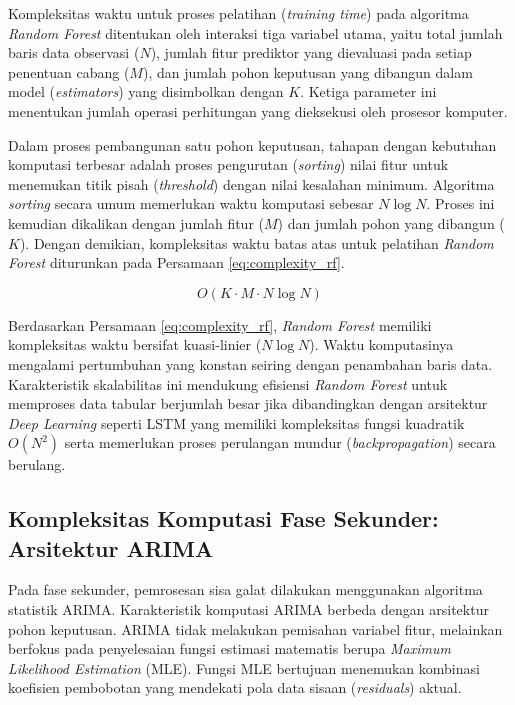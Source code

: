 Kompleksitas waktu untuk proses pelatihan (\textit{training time}) pada algoritma \textit{Random Forest} ditentukan oleh interaksi tiga variabel utama, yaitu total jumlah baris data observasi ($N$), jumlah fitur prediktor yang dievaluasi pada setiap penentuan cabang ($M$), dan jumlah pohon keputusan yang dibangun dalam model (\textit{estimators}) yang disimbolkan dengan $K$. Ketiga parameter ini menentukan jumlah operasi perhitungan yang dieksekusi oleh prosesor komputer.

Dalam proses pembangunan satu pohon keputusan, tahapan dengan kebutuhan komputasi terbesar adalah proses pengurutan (\textit{sorting}) nilai fitur untuk menemukan titik pisah (\textit{threshold}) dengan nilai kesalahan minimum. Algoritma \textit{sorting} secara umum memerlukan waktu komputasi sebesar $N \log N$. Proses ini kemudian dikalikan dengan jumlah fitur ($M$) dan jumlah pohon yang dibangun ($K$). Dengan demikian, kompleksitas waktu batas atas untuk pelatihan \textit{Random Forest} diturunkan pada Persamaan \ref{eq:complexity_rf}.

\begin{equation}
    O(K \cdot M \cdot N \log N)
\label{eq:complexity_rf}
\end{equation}

Berdasarkan Persamaan \ref{eq:complexity_rf}, \textit{Random Forest} memiliki kompleksitas waktu bersifat kuasi-linier ($N \log N$). Waktu komputasinya mengalami pertumbuhan yang konstan seiring dengan penambahan baris data. Karakteristik skalabilitas ini mendukung efisiensi \textit{Random Forest} untuk memproses data tabular berjumlah besar jika dibandingkan dengan arsitektur \textit{Deep Learning} seperti LSTM yang memiliki kompleksitas fungsi kuadratik $O(N^2)$ serta memerlukan proses perulangan mundur (\textit{backpropagation}) secara berulang.

\subsection{Kompleksitas Komputasi Fase Sekunder: Arsitektur ARIMA}

Pada fase sekunder, pemrosesan sisa galat dilakukan menggunakan algoritma statistik ARIMA. Karakteristik komputasi ARIMA berbeda dengan arsitektur pohon keputusan. ARIMA tidak melakukan pemisahan variabel fitur, melainkan berfokus pada penyelesaian fungsi estimasi matematis berupa \textit{Maximum Likelihood Estimation} (MLE). Fungsi MLE bertujuan menemukan kombinasi koefisien pembobotan yang mendekati pola data sisaan (\textit{residuals}) aktual.


